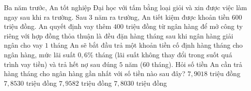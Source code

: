 \begin{ex}%
    [THPT Đồng Quan - Hà Nội - 2021]%
    Ba năm trước, An tốt nghiệp Đại học với tấm bằng loại giỏi và xin được việc làm ngay sau khi ra trường. Sau $3$ năm ra trường, An tiết kiệm được khoản tiền $600$ triệu đồng. An quyết định vay thêm $400$ triệu đồng từ ngân hàng để mở công ty riêng với hợp đồng thỏa thuận là đều đặn hàng tháng sau khi ngân hàng giải ngân cho vay $1$ tháng An sẽ bắt đầu trả một khoản tiền cố định hàng tháng cho ngân hàng, mức lãi suất $0,6\%$ tháng (lãi suất không thay đổi trong suốt quá trình vay tiền) và trả hết nợ sau đúng $5$ năm ($60$ tháng). Hỏi số tiền An cần trả hàng tháng cho ngân hàng gần nhất với số tiền nào sau đây?
    \choice
    {$7,9018$ triệu đồng}
    {$7,8530$ triệu đồng}
    {\True $7,9582$ triệu đồng}
    {$7,8030$ triệu đồng}
\end{ex}
